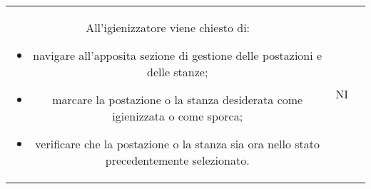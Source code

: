{\begin{longtable}{ c C{11cm} c }
        All'igienizzatore viene chiesto di:
        \begin{itemize}
            \item navigare all'apposita sezione di gestione delle postazioni e delle stanze;
            \item marcare la postazione o la stanza desiderata come igienizzata o come sporca;
            \item verificare che la postazione o la stanza sia ora nello stato precedentemente selezionato.
        \end{itemize}&
        NI\\
        
        
    \end{longtable}
}